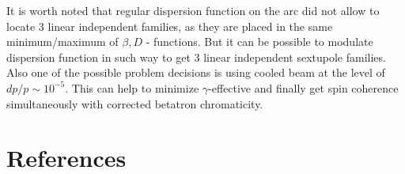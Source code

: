 \documentclass[a4paper]{jpconf}
\begin{document}
\par It is worth noted that regular dispersion function on the arc did not allow to locate 3 linear independent families, as they are placed in the same minimum/maximum of $\beta, D$ - functions.
But it can be possible to modulate dispersion function in such way to get 3 linear independent sextupole families.
Also one of the possible problem decisions is using cooled beam at the level of ${dp}/{p}\sim10^{-5}$. This can help to minimize $\gamma$-effective and finally get spin coherence simultaneously with corrected betatron chromaticity.

\section*{References}


\end{document}
